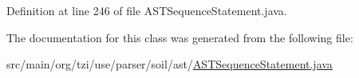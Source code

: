 Definition at line 246 of file A\-S\-T\-Sequence\-Statement.\-java.



The documentation for this class was generated from the following file\-:\begin{DoxyCompactItemize}
\item 
src/main/org/tzi/use/parser/soil/ast/\hyperlink{_a_s_t_sequence_statement_8java}{A\-S\-T\-Sequence\-Statement.\-java}\end{DoxyCompactItemize}
